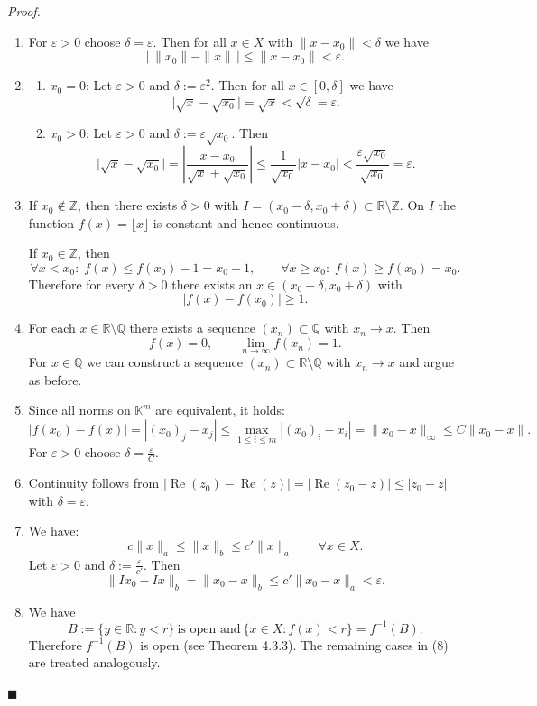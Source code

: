 \documentclass[12pt]{article}
\begin{document}
\emph{Proof.}
\begin{enumerate}[label=({\arabic*})]
	\item For $\varepsilon > 0$ choose $\delta = \varepsilon$. Then for all $x \in X$ with $\|x - x_0\| < \delta$ we have
	\[
		\bigl|\,\|x_0\| - \|x\|\,\bigr| \le \|x - x_0\| < \varepsilon.
	\]
	\item
		\begin{enumerate}[label=\alph*)]
			\item $x_0 = 0$:
			Let $\varepsilon > 0$ and $\delta := \varepsilon^2$. Then for all $x \in [0,\delta]$ we have
			\[
				\bigl|\sqrt{x} - \sqrt{x_0}\bigr| = \sqrt{x} < \sqrt{\delta} = \varepsilon.
			\]
			\item $x_0 > 0$:
			Let $\varepsilon > 0$ and $\delta := \varepsilon\sqrt{x_0}$. Then
			\[
				\bigl|\sqrt{x} - \sqrt{x_0}\bigr| = \left|\frac{x - x_0}{\sqrt{x} + \sqrt{x_0}}\right| \le \frac{1}{\sqrt{x_0}}|x - x_0| < \frac{\varepsilon\sqrt{x_0}}{\sqrt{x_0}} = \varepsilon.
			\]
		\end{enumerate}
		\item If $x_0 \notin \mathbb Z$, then there exists $\delta > 0$ with $I = (x_0 - \delta, x_0 + \delta) \subset \mathbb R \setminus \mathbb Z$. On $I$ the function $f(x) = \lfloor x \rfloor$ is constant and hence continuous.

		If $x_0 \in \mathbb Z$, then
		\[
			\forall x < x_0:\; f(x) \le f(x_0) - 1 = x_0 - 1, \qquad
			\forall x \ge x_0:\; f(x) \ge f(x_0) = x_0.
		\]
		Therefore for every $\delta > 0$ there exists an $x \in (x_0 - \delta, x_0 + \delta)$ with
		\[
			|f(x) - f(x_0)| \ge 1.
		\]
		\item For each $x \in \mathbb R \setminus \mathbb Q$ there exists a sequence $(x_n) \subset \mathbb Q$ with $x_n \to x$. Then
		\[
			f(x) = 0, \qquad \lim_{n\to\infty} f(x_n) = 1.
		\]
		For $x \in \mathbb Q$ we can construct a sequence $(x_n) \subset \mathbb R\setminus \mathbb Q$ with $x_n \to x$ and argue as before.
		\item Since all norms on $\mathbb K^m$ are equivalent, it holds:
		\[
			|f(x_0) - f(x)| = |(x_0)_j - x_j| \le \max_{1\le i\le m} |(x_0)_i - x_i| = \|x_0 - x\|_{\infty} \le C\|x_0 - x\|.
		\]
		For $\varepsilon > 0$ choose $\delta = \frac{\varepsilon}{C}$.
		\item Continuity follows from $|\operatorname{Re}(z_0) - \operatorname{Re}(z)| = |\operatorname{Re}(z_0 - z)| \le |z_0 - z|$ with $\delta = \varepsilon$.
		\item We have:
		\[
			c\|x\|_a \le \|x\|_b \le c'\|x\|_a \qquad \forall x \in X.
		\]
		Let $\varepsilon > 0$ and $\delta := \frac{\varepsilon}{c'}$. Then
		\[
			\|Ix_0 - Ix\|_b = \|x_0 - x\|_b \le c'\|x_0 - x\|_a < \varepsilon.
		\]
		\item We have
		\[
			B := \{y \in \mathbb R : y < r\}\ \text{is open and}\ \{x \in X : f(x) < r\} = f^{-1}(B).
		\]
		Therefore $f^{-1}(B)$ is open (see Theorem 4.3.3). The remaining cases in (8) are treated analogously.
	\end{enumerate}
	\hfill $\blacksquare$
\end{document}
